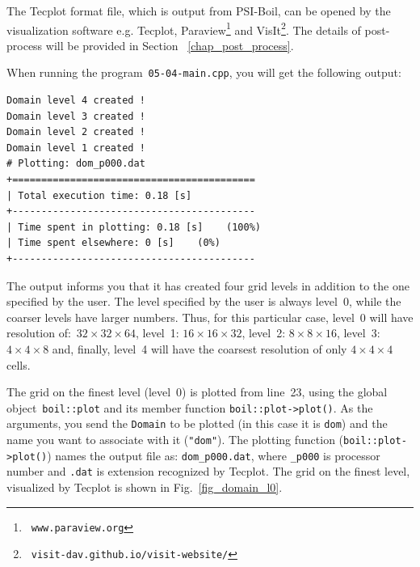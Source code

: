 The Tecplot format file, which is output from PSI-Boil, can be opened by the 
visualization software e.g. Tecplot, Paraview\footnote{\ {\tt www.paraview.org}} 
and VisIt\footnote{\ {\tt visit-dav.github.io/visit-website/}}. 
The details of post-process will be provided in Section ~\ref{chap_post_process}.


When running the program~{\tt 05-04-main.cpp}, you will get the following output:
%
{\small \begin{verbatim}
Domain level 4 created !
Domain level 3 created !
Domain level 2 created !
Domain level 1 created !
# Plotting: dom_p000.dat
+==========================================
| Total execution time: 0.18 [s]
+------------------------------------------
| Time spent in plotting: 0.18 [s]    (100%)
| Time spent elsewhere: 0 [s]    (0%)
+------------------------------------------
\end{verbatim}}
%
The output informs you that it has created four grid levels in addition to the
one specified by the user. The level specified by the user is always level~0,
while the coarser levels have larger numbers. Thus, for this particular case,
level~0 will have resolution of:~$32 \times 32 \times 64$, 
level~1: $16 \times 16 \times 32$, level~2: $8 \times 8 \times 16$, 
level~3: $4 \times 4 \times 8$ and, finally, level~4 will have the coarsest 
resolution of only $4 \times 4 \times 4$ cells. 

The grid on the finest level (level~0) is plotted from line~23, using the global
object~{\tt boil::plot} and its member function {\tt boil::plot->plot()}. As the
arguments, you send the {\tt Domain} to be plotted (in this case it is {\tt dom})
and the name you want to associate with it ({\tt "dom"}). The plotting function
({\tt boil::plot->plot()}) names the output file as: {\tt dom\_p000.dat}, where
{\tt \_p000} is processor number and {\tt .dat} is extension recognized by
Tecplot. The grid on the finest level, visualized by Tecplot is shown in 
Fig.~\ref{fig_domain_l0}. 

